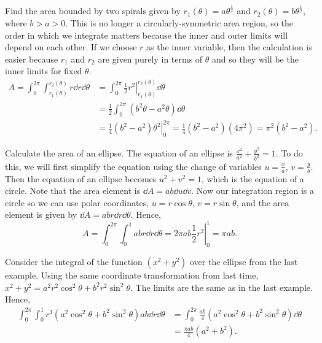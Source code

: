 \documentclass[../multivariate_calculus.tex]{subfiles}
\begin{document}
        \begin{example}
            Find the area bounded by two spirals given by $r_1(\theta)=a\theta^\frac{1}{2}$ and $r_2(\theta)=b\theta^\frac{1}{2}$, where $b>a>0$.
            This is no longer a circularly-symmetric area region, so the order in which we integrate matters because the inner and outer limits will depend on each other.
            If we choose $r$ as the inner variable, then the calculation is easier because $r_1$ and $r_2$ are given purely in terms of $\theta$ and so they will be the inner limits for fixed $\theta$.
            \begin{align}
                A=\int_0^{2\pi}\int_{r_1(\theta)}^{r_2(\theta)}r\dd{r}\dd{\theta}&=\int_0^{2\pi}\left.\frac{1}{2}r^2\right|_{r_1(\theta)}^{r_2(\theta)}\dd{\theta}\\
                &=\frac{1}{2}\int_0^{2\pi}(b^2\theta-a^2\theta)\dd{\theta}\\
                &=\left.\frac{1}{4}(b^2-a^2)\theta^2\right|_0^{2\pi}=\frac{1}{4}(b^2-a^2)(4\pi^2)=\pi^2(b^2-a^2).
            \end{align}
        \end{example}
        \begin{example}
            Calculate the area of an ellipse.
            The equation of an ellipse is $\frac{x^2}{a^2}+\frac{y^2}{b^2}=1$.
            To do this, we will first simplify the equation using the change of variables $u=\frac{x}{a}$, $v=\frac{y}{b}$.
            Then the equation of an ellipse becomes $u^2+v^2=1$, which is the equation of a circle.
            Note that the area element is $\dd{A}=ab\dd{u}\dd{v}$.
            Now our integration region is a circle so we can use polar coordinates, $u=r\cos\theta$, $v=r\sin\theta$, and the area element is given by $\dd{A}=abr\dd{r}\dd{\theta}$.
            Hence,
            \begin{equation}
                A=\int_0^{2\pi}\int_0^1 abr\dd{r}\dd{\theta}=\left.2\pi ab\frac{1}{2}r^2\right|_0^1=\pi ab.
            \end{equation}
        \end{example}
        \begin{example}
            Consider the integral of the function $(x^2+y^2)$ over the ellipse from the last example.
            Using the same coordinate transformation from last time, $x^2+y^2=a^2r^2\cos^2\theta+b^2r^2\sin^2\theta$.
            The limits are the same as in the last example.
            Hence,
            \begin{align}
                \int_0^{2\pi}\int_0^1 r^3(a^2\cos^2\theta+b^2\sin^2\theta)ab\dd{r}\dd{\theta}&=\int_0^{2\pi}\frac{ab}{4}(a^2\cos^2\theta+b^2\sin^2\theta)\dd{\theta}\\
                &=\frac{\pi ab}{4}(a^2+b^2).
            \end{align}
        \end{example}
\end{document}
